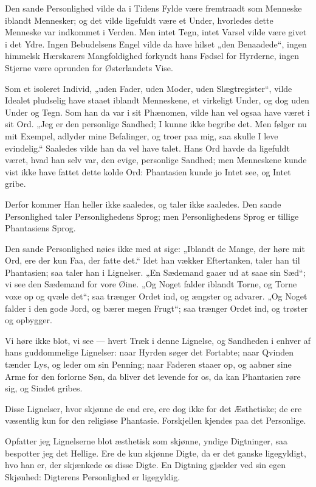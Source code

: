 \documentclass[12pt,a4paper]{book}
\newcommand{\apage}[1]{\marginnote{\footnotesize\textit{[#1]}}}
\begin{document}
Den sande Personlighed vilde da i Tidens Fylde være fremtraadt som Menneske
iblandt Mennesker; og det vilde ligefuldt være et Under, hvorledes dette
Menneske var indkommet i Verden. Men intet Tegn, intet Varsel vilde være
givet i det Ydre. Ingen Bebudelsens Engel vilde da have hilset „den
Benaadede“, ingen himmelsk Hærskarers Mangfoldighed forkyndt hans Fødsel for
Hyrderne, ingen Stjerne være oprunden for Østerlandets Vise.

Som et isoleret Individ, „uden Fader, uden Moder, uden Slægtregister“, vilde
Idealet pludselig have staaet iblandt Menneskene, et virkeligt Under, og dog
uden Under og Tegn. Som han da var i sit Phænomen, vilde han vel ogsaa have
været i sit Ord. „Jeg er den personlige Sandhed; I kunne ikke begribe det.
Men følger nu mit Exempel, adlyder mine Befalinger, og troer paa mig, saa
skulle I leve evindelig.“ Saaledes vilde han da vel have talet. Hans Ord
havde da ligefuldt været, hvad han selv var, den evige, personlige Sandhed;
men Menneskene kunde vist ikke have fattet dette kolde Ord: Phantasien kunde
jo Intet see, og Intet gribe.

Derfor kommer Han heller ikke saaledes, og taler ikke saaledes. Den sande
Personlighed taler Personlighedens Sprog; men Personlighedens Sprog er
tillige Phantasiens Sprog.

Den sande Personlighed nøies ikke med at sige: „Iblandt de Mange, der høre
mit Ord, ere der kun Faa, der fatte det.“ Idet han vækker Eftertanken, taler
han til Phantasien; saa taler han i Lignelser. „En Sædemand gaaer ud at saae
sin Sæd“; vi see den Sædemand for vore Øine. „Og Noget falder iblandt Torne,
og Torne voxe op og qvæle det“; saa trænger Ordet ind, og ængster og advarer.
„Og Noget falder i den gode Jord, og bærer megen Frugt“; saa trænger Ordet
ind, og trøster og opbygger.

Vi høre ikke blot, vi see --- hvert Træk i denne Lignelse, og Sandheden i
enhver af hans guddommelige Lignelser: naar Hyrden søger det Fortabte; naar
Qvinden tænder Lys, og leder om sin Penning; naar Faderen staaer op, og
aabner sine
Arme for den forlorne Søn, da bliver det levende for os, da kan Phantasien
røre sig, og Sindet gribes.

Disse Lignelser, hvor skjønne de end ere, ere dog ikke for det \apage{19} Æsthetiske; de
ere væsentlig kun for den religiøse Phantasie. Forskjellen kjendes paa det
Personlige.

Opfatter jeg Lignelserne blot æsthetisk som skjønne, yndige Digtninger, saa
bespotter jeg det Hellige. Ere de kun skjønne Digte, da er det ganske
ligegyldigt, hvo han er, der skjænkede os disse Digte. En Digtning gjælder
ved sin egen Skjønhed: Digterens Personlighed er ligegyldig.
\end{document}
